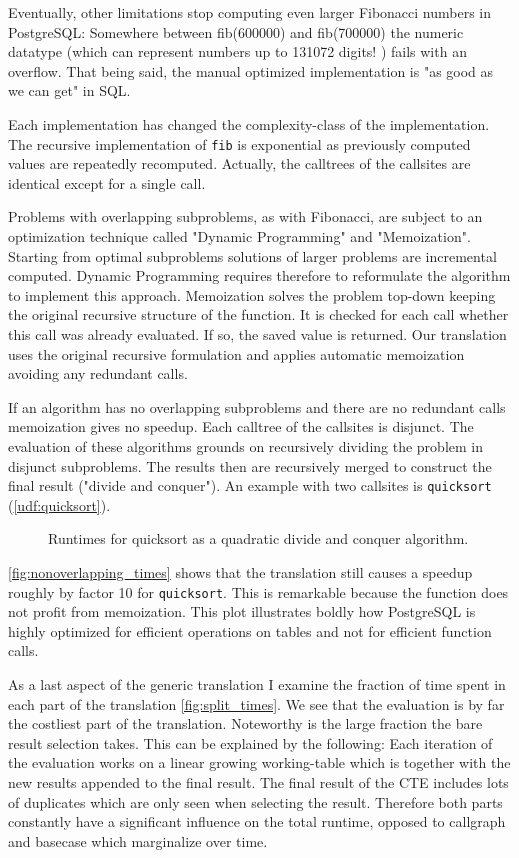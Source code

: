 Eventually, other limitations stop computing even larger Fibonacci numbers in PostgreSQL: Somewhere between fib(600000) and fib(700000) the numeric datatype (which can represent numbers up to 131072 digits! \cite[p. 124 f.]{psql}) fails with an overflow. That being said, the manual optimized implementation is "as good as we can get" in SQL.

Each implementation has changed the complexity-class of the implementation. The recursive implementation of \texttt{fib} is exponential as previously computed values are repeatedly recomputed. Actually, the calltrees of the callsites are identical except for a single call.

Problems with overlapping subproblems, as with Fibonacci, are subject to an optimization technique called "Dynamic Programming" and "Memoization". Starting from optimal subproblems solutions of larger problems are incremental computed. Dynamic Programming requires therefore to reformulate the algorithm to implement this approach. Memoization solves the problem top-down keeping the original recursive structure of the function. It is checked for each call whether this call was already evaluated. If so, the saved value is returned. Our translation uses the original recursive formulation and applies automatic memoization avoiding any redundant calls.

If an algorithm has no overlapping subproblems and there are no redundant calls memoization gives no speedup. Each calltree of the callsites is disjunct. The evaluation of these algorithms grounds on recursively dividing the problem in disjunct subproblems. The results then are recursively merged to construct the final result ("divide and conquer"). An example with two callsites is \texttt{quicksort} (\autoref{udf:quicksort}).

\begin{figure}[h!]
    \centering\small
    
    \caption{Runtimes for quicksort as a quadratic divide and conquer algorithm.}
    \label{fig:nonoverlapping_times}
\end{figure}

\autoref{fig:nonoverlapping_times} shows that the translation still causes a speedup roughly by factor 10 for \texttt{quicksort}. This is remarkable because the function does not profit from memoization. This plot illustrates boldly how PostgreSQL is highly optimized for efficient operations on tables and not for efficient function calls.

As a last aspect of the generic translation I examine the fraction of time spent in each part of the translation \autoref{fig:split_times}. We see that the evaluation is by far the costliest part of the translation. Noteworthy is the large fraction the bare result selection takes. This can be explained by the following: Each iteration of the evaluation works on a linear growing working-table which is together with the new results appended to the final result. The final result of the CTE includes lots of duplicates which are only seen when selecting the result. Therefore both parts constantly have a significant influence on the total runtime, opposed to callgraph and basecase which marginalize over time.

